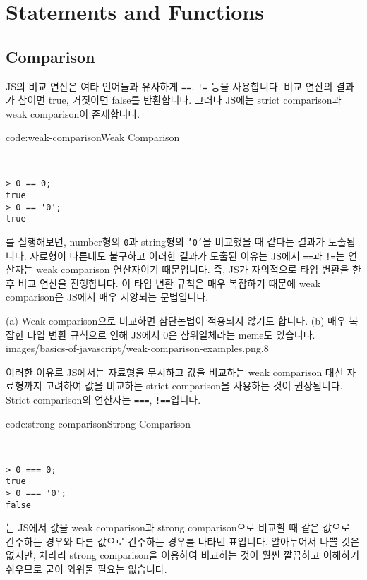 \section{Statements and Functions} \label{sect:statements-and-functions}

\subsection*{Comparison}

JS의 비교 연산은 여타 언어들과 유사하게 \texttt{==}, \texttt{!=} 등을 사용합니다. 비교 연산의 결과가 참이면 true, 거짓이면 false를 반환합니다. 그러나 JS에는 strict comparison과 weak comparison이 존재합니다. 

\begin{codeenv}{code:weak-comparison}{Weak Comparison}\begin{verbatim}


> 0 == 0;
true
> 0 == '0';
true
\end{verbatim}
\end{codeenv}

를 실행해보면, number형의 \texttt{0}과 string형의 \texttt{'0'}을 비교했을 때 같다는 결과가 도출됩니다. 자료형이 다른데도 불구하고 이러한 결과가 도출된 이유는 JS에서 \texttt{==}과 \texttt{!=}는 연산자는 weak comparison 연산자이기 때문입니다. 즉, JS가 자의적으로 타입 변환을 한 후 비교 연산을 진행합니다. 이 타입 변환 규칙은 매우 복잡하기 때문에 weak comparison은 JS에서 매우 지양되는 문법입니다. 

    {(a) Weak comparison으로 비교하면 삼단논법이 적용되지 않기도 합니다. (b) 매우 복잡한 타입 변환 규칙으로 인해 JS에서 0은 삼위일체라는 meme도 있습니다.}
    {images/basics-of-javascript/weak-comparison-examples.png}{.8}

이러한 이유로 JS에서는 자료형을 무시하고 값을 비교하는 weak comparison 대신 자료형까지 고려하여 값을 비교하는 strict comparison을 사용하는 것이 권장됩니다. Strict comparison의 연산자는 \texttt{===}, \texttt{!==}입니다.

\begin{codeenv}{code:strong-comparison}{Strong Comparison}\begin{verbatim}


> 0 === 0;
true
> 0 === '0';
false
\end{verbatim}
\end{codeenv}

는 JS에서 값을 weak comparison과 strong comparison으로 비교할 때 같은 값으로 간주하는 경우와 다른 값으로 간주하는 경우를 나타낸 표입니다. 알아두어서 나쁠 것은 없지만, 차라리 strong comparison을 이용하여 비교하는 것이 훨씬 깔끔하고 이해하기 쉬우므로 굳이 외워둘 필요는 없습니다. 

